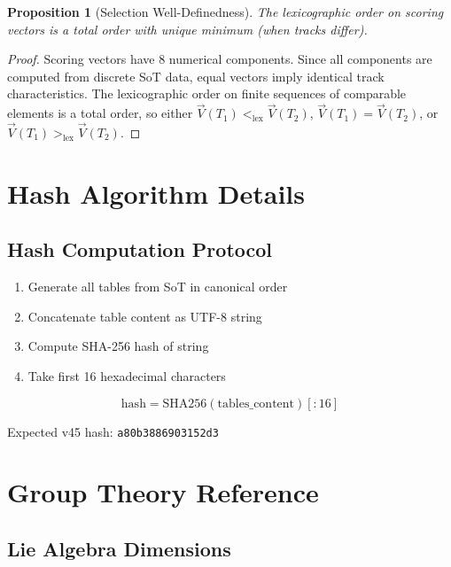 \documentclass[11pt,a4paper]{article}
\newtheorem{proposition}{Proposition}[section]
\begin{document}
\begin{proposition}[Selection Well-Definedness]
\label{prop:well-defined}
The lexicographic order on scoring vectors is a total order with unique minimum
(when tracks differ).
\end{proposition}

\begin{proof}
Scoring vectors have 8 numerical components. Since all components are computed
from discrete SoT data, equal vectors imply identical track characteristics.
The lexicographic order on finite sequences of comparable elements is a total
order, so either $\vec{V}(T_1) <_{\text{lex}} \vec{V}(T_2)$,
$\vec{V}(T_1) = \vec{V}(T_2)$, or $\vec{V}(T_1) >_{\text{lex}} \vec{V}(T_2)$.
\end{proof}

\section{Hash Algorithm Details}
\label{app:hash}

\subsection{Hash Computation Protocol}
\label{app:hash-protocol}

\begin{enumerate}
\item Generate all tables from SoT in canonical order
\item Concatenate table content as UTF-8 string
\item Compute SHA-256 hash of string
\item Take first 16 hexadecimal characters
\end{enumerate}

\begin{equation}
\label{eq:hash-formula}
\text{hash} = \text{SHA256}(\text{tables\_content})[:16]
\end{equation}

Expected v45 hash: \texttt{a80b3886903152d3}

\section{Group Theory Reference}
\label{app:group-theory}

\subsection{Lie Algebra Dimensions}
\label{app:lie-dim}
\end{document}
